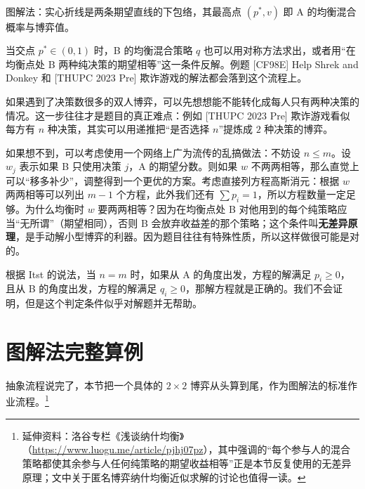 \documentclass[UTF8,a4paper,11pt,oneside,openany,fontset=fandol]{ctexbook}
\theoremstyle{definition}
\begin{document}
\begin{center}
\\[2pt]
{\small 图解法：实心折线是两条期望直线的下包络，其最高点 $(p^*,v)$ 即 A 的均衡混合概率与博弈值。}
\end{center}

当交点 $p^*\in(0,1)$ 时，B 的均衡混合策略 $q$ 也可以用对称方法求出，或者用“在均衡点处 B 两种纯决策的期望相等”这一条件反解。例题 [CF98E] Help Shrek and Donkey 和 [THUPC 2023 Pre] 欺诈游戏的解法都会落到这个流程上。

如果遇到了决策数很多的双人博弈，可以先想想能不能转化成每人只有两种决策的情况。这一步往往才是题目的真正难点：例如 [THUPC 2023 Pre] 欺诈游戏看似每方有 $n$ 种决策，其实可以用递推把“是否选择 $n$”提炼成 $2$ 种决策的博弈。

如果想不到，可以考虑使用一个网络上广为流传的乱搞做法：不妨设 $n\le m$。设 $w_j$ 表示如果 B 只使用决策 $j$，A 的期望分数。则如果 $w$ 不两两相等，那么直觉上可以“移多补少”，调整得到一个更优的方案。考虑直接列方程高斯消元：根据 $w$ 两两相等可以列出 $m-1$ 个方程，此外我们还有 $\sum p_i=1$，所以方程数量一定足够。为什么均衡时 $w$ 要两两相等？因为在均衡点处 B 对他用到的每个纯策略应当“无所谓”（期望相同），否则 B 会放弃收益差的那个策略；这个条件叫\textbf{无差异原理}，是手动解小型博弈的利器。因为题目往往有特殊性质，所以这样做很可能是对的。

根据 Itst 的说法，当 $n=m$ 时，如果从 A 的角度出发，方程的解满足 $p_i\ge0$，且从 B 的角度出发，方程的解满足 $q_i\ge0$，那解方程就是正确的。我们不会证明，但是这个判定条件似乎对解题并无帮助。

\section{图解法完整算例}
抽象流程说完了，本节把一个具体的 $2\times2$ 博弈从头算到尾，作为图解法的标准作业流程。\footnote{延伸资料：洛谷专栏《浅谈纳什均衡》（\url{https://www.luogu.me/article/pjhj07pz}），其中强调的“每个参与人的混合策略都使其余参与人任何纯策略的期望收益相等”正是本节反复使用的无差异原理；文中关于匿名博弈纳什均衡近似求解的讨论也值得一读。}
\end{document}
